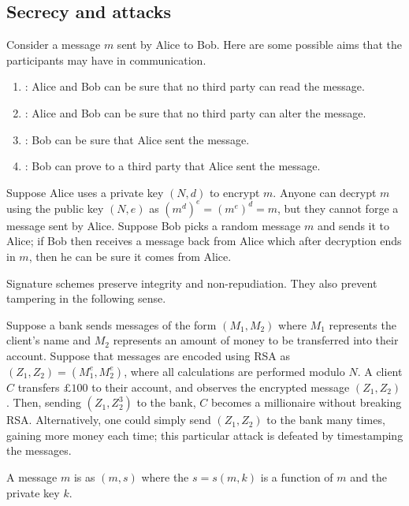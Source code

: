 \subsection{Secrecy and attacks}
Consider a message $m$ sent by Alice to Bob.
Here are some possible aims that the participants may have in communication.
\begin{enumerate}
    \item {}: Alice and Bob can be sure that no third party can read the message.
    \item {}: Alice and Bob can be sure that no third party can alter the message.
    \item {}: Bob can be sure that Alice sent the message.
    \item {}: Bob can prove to a third party that Alice sent the message.
\end{enumerate}
\begin{example}
    Suppose Alice uses a private key $(N, d)$ to encrypt $m$.
    Anyone can decrypt $m$ using the public key $(N, e)$ as $(m^d)^e = (m^e)^d = m$, but they cannot forge a message sent by Alice.
    Suppose Bob picks a random message $m$ and sends it to Alice; if Bob then receives a message back from Alice which after decryption ends in $m$, then he can be sure it comes from Alice.
\end{example}
Signature schemes preserve integrity and non-repudiation.
They also prevent tampering in the following sense.
\begin{example}
    Suppose a bank sends messages of the form $(M_1, M_2)$ where $M_1$ represents the client's name and $M_2$ represents an amount of money to be transferred into their account.
    Suppose that messages are encoded using RSA as $(Z_1, Z_2) = (M_1^e, M_2^e)$, where all calculations are performed modulo $N$.
    A client $C$ transfers $\pounds 100$ to their account, and observes the encrypted message $(Z_1, Z_2)$.
    Then, sending $(Z_1, Z_2^3)$ to the bank, $C$ becomes a millionaire without breaking RSA.
    Alternatively, one could simply send $(Z_1, Z_2)$ to the bank many times, gaining more money each time; this particular attack is defeated by timestamping the messages.
\end{example}
\begin{definition}
    A message $m$ is  as $(m, s)$ where the  $s = s(m,k)$ is a function of $m$ and the private key $k$.
\end{definition}

